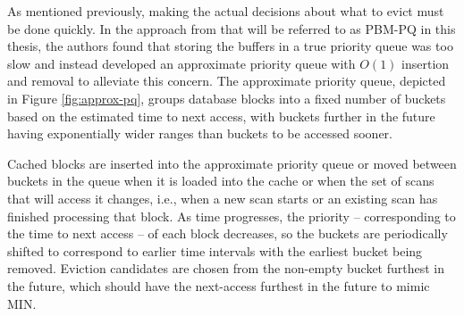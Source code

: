 As mentioned previously, making the actual decisions about what to evict must be done quickly. In the approach from \cite{pbm} that will be referred to as PBM-PQ in this thesis, the authors found that storing the buffers in a true priority queue was too slow and instead developed an approximate priority queue with $O(1)$ insertion and removal to alleviate this concern. The approximate priority queue, depicted in Figure \ref{fig:approx-pq}, groups database blocks into a fixed number of buckets based on the estimated time to next access, with buckets further in the future having exponentially wider ranges than buckets to be accessed sooner.

Cached blocks are inserted into the approximate priority queue or moved between buckets in the queue when it is loaded into the cache or when the set of scans that will access it changes, i.e., when a new scan starts or an existing scan has finished processing that block. As time progresses, the priority -- corresponding to the time to next access -- of each block decreases, so the buckets are periodically shifted to correspond to earlier time intervals with the earliest bucket being removed. Eviction candidates are chosen from the non-empty bucket furthest in the future, which should have the next-access furthest in the future to mimic MIN.